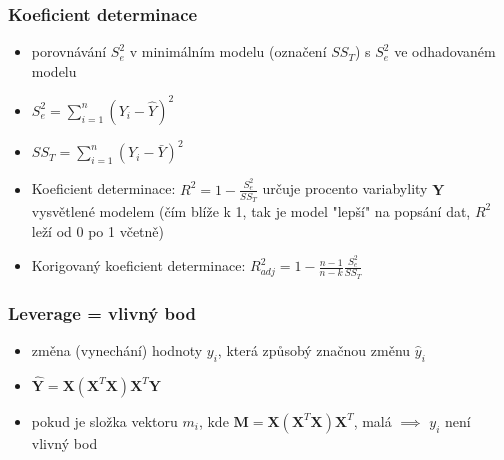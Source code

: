 \documentclass[a4]{report}
\theoremstyle{definition}
\begin{document}
{%
\subsubsection{Koeficient determinace}
\begin{itemize}
    \item porovnávání $S_{e}^{2}$ v minimálním modelu (označení $SS_T$) s $S_{e}^{2}$ ve odhadovaném modelu 
    \item $S_{e}^{2} = \sum_{i=1}^{n} \left( Y_i - \hat{Y} \right)^2$
    \item $SS_{T} = \sum_{i=1}^{n} \left( Y_i - \bar{Y} \right)^2$
    \item Koeficient determinace: $R^2 = 1 -\frac{S_{e}^{2}}{SS_{T}}$ určuje procento variabylity $\mathbf{Y}$ vysvětlené modelem (čím blíže k 1, tak je model "lepší" na popsání dat, $R^2$ leží od 0 po 1 včetně)
    \item Korigovaný koeficient determinace:  $R_{adj}^{2} = 1 -\frac{n-1}{n-k} \frac{S_{e}^{2}}{SS_{T}}$
\end{itemize}

\subsubsection{Leverage = vlivný bod}
\begin{itemize}
    \item změna (vynechání) hodnoty $y_i$, která způsobý značnou změnu $\hat{y}_i$
    \item $\hat{\mathbf{Y}} = \mathbf{X} \left( \mathbf{X}^T \mathbf{X} \right) \mathbf{X} ^T \mathbf{Y}$
    \item pokud je složka vektoru $m_i$, kde $\mathbf{M} = \mathbf{X} \left( \mathbf{X}^T \mathbf{X} \right) \mathbf{X} ^T$, malá $\implies$ $y_i$ není vlivný bod 
\end{itemize}

}
\end{document}
